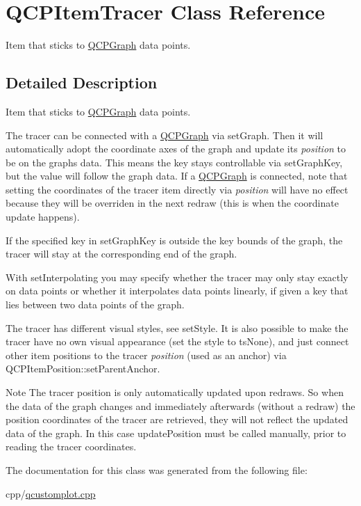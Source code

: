 \hypertarget{class_q_c_p_item_tracer}{}\section{Q\+C\+P\+Item\+Tracer Class Reference}
\label{class_q_c_p_item_tracer}


Item that sticks to \mbox{\hyperlink{class_q_c_p_graph}{Q\+C\+P\+Graph}} data points.  




\subsection{Detailed Description}
Item that sticks to \mbox{\hyperlink{class_q_c_p_graph}{Q\+C\+P\+Graph}} data points. 

 The tracer can be connected with a \mbox{\hyperlink{class_q_c_p_graph}{Q\+C\+P\+Graph}} via set\+Graph. Then it will automatically adopt the coordinate axes of the graph and update its {\itshape position} to be on the graph\textquotesingle{}s data. This means the key stays controllable via set\+Graph\+Key, but the value will follow the graph data. If a \mbox{\hyperlink{class_q_c_p_graph}{Q\+C\+P\+Graph}} is connected, note that setting the coordinates of the tracer item directly via {\itshape position} will have no effect because they will be overriden in the next redraw (this is when the coordinate update happens).

If the specified key in set\+Graph\+Key is outside the key bounds of the graph, the tracer will stay at the corresponding end of the graph.

With set\+Interpolating you may specify whether the tracer may only stay exactly on data points or whether it interpolates data points linearly, if given a key that lies between two data points of the graph.

The tracer has different visual styles, see set\+Style. It is also possible to make the tracer have no own visual appearance (set the style to ts\+None), and just connect other item positions to the tracer {\itshape position} (used as an anchor) via Q\+C\+P\+Item\+Position\+::set\+Parent\+Anchor.

\begin{DoxyNote}{Note}
The tracer position is only automatically updated upon redraws. So when the data of the graph changes and immediately afterwards (without a redraw) the position coordinates of the tracer are retrieved, they will not reflect the updated data of the graph. In this case update\+Position must be called manually, prior to reading the tracer coordinates. 
\end{DoxyNote}


The documentation for this class was generated from the following file\+:\begin{DoxyCompactItemize}
\item 
cpp/\mbox{\hyperlink{qcustomplot_8cpp}{qcustomplot.\+cpp}}\end{DoxyCompactItemize}
